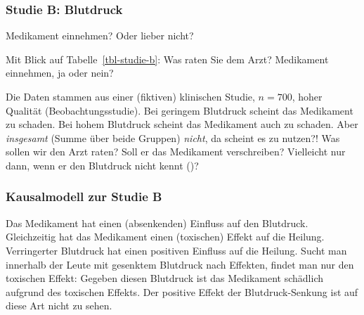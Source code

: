 \documentclass[
  ngerman,
  letterpaper,
  twoside,
  open=any]{scrbook}
\theoremstyle{definition}
\theoremstyle{plain}
\theoremstyle{definition}
\theoremstyle{definition}
\theoremstyle{remark}
\begin{document}
\subsubsection{Studie B: Blutdruck}\label{studie-b-blutdruck}

Medikament einnehmen? Oder lieber nicht?

Mit Blick auf Tabelle~\ref{tbl-studie-b}: Was raten Sie dem Arzt?
Medikament einnehmen, ja oder nein?

\begin{table}

\caption{\label{tbl-studie-b}Daten zur Wirksamkeit eines Medikaments
(Studie B)}


\end{table}%

Die Daten stammen aus einer (fiktiven) klinischen Studie, \(n=700\),
hoher Qualität (Beobachtungsstudie). Bei geringem Blutdruck scheint das
Medikament zu schaden. Bei hohem Blutdruck scheint das Medikament auch
zu schaden. Aber \emph{insgesamt} (Summe über beide Gruppen)
\emph{nicht}, da scheint es zu nutzen?! Was sollen wir den Arzt raten?
Soll er das Medikament verschreiben? Vielleicht nur dann, wenn er den
Blutdruck nicht kennt ()?

\subsubsection{Kausalmodell zur Studie
B}\label{kausalmodell-zur-studie-b}

Das Medikament hat einen (absenkenden) Einfluss auf den Blutdruck.
Gleichzeitig hat das Medikament einen (toxischen) Effekt auf die
Heilung. Verringerter Blutdruck hat einen positiven Einfluss auf die
Heilung. Sucht man innerhalb der Leute mit gesenktem Blutdruck nach
Effekten, findet man nur den toxischen Effekt: Gegeben diesen Blutdruck
ist das Medikament schädlich aufgrund des toxischen Effekts. Der
positive Effekt der Blutdruck-Senkung ist auf diese Art nicht zu sehen.
\end{document}
